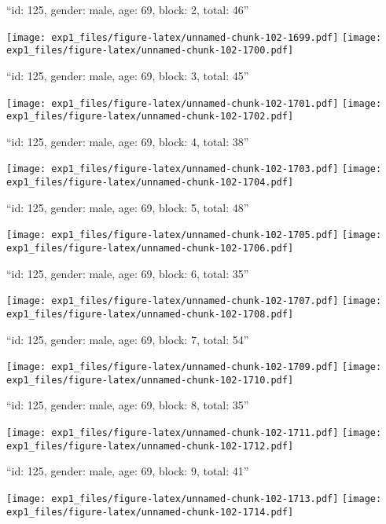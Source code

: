 \documentclass[11pt,,]{article}
\begin{document}
\newpage
[1] 

``id: 125, gender: male, age: 69, block: 2, total: 46''

\texttt{[image: exp1\_files/figure-latex/unnamed-chunk-102-1699.pdf]}
\texttt{[image: exp1\_files/figure-latex/unnamed-chunk-102-1700.pdf]}

\newpage
[1] 

``id: 125, gender: male, age: 69, block: 3, total: 45''

\texttt{[image: exp1\_files/figure-latex/unnamed-chunk-102-1701.pdf]}
\texttt{[image: exp1\_files/figure-latex/unnamed-chunk-102-1702.pdf]}

\newpage
[1] 

``id: 125, gender: male, age: 69, block: 4, total: 38''

\texttt{[image: exp1\_files/figure-latex/unnamed-chunk-102-1703.pdf]}
\texttt{[image: exp1\_files/figure-latex/unnamed-chunk-102-1704.pdf]}

\newpage
[1] 

``id: 125, gender: male, age: 69, block: 5, total: 48''

\texttt{[image: exp1\_files/figure-latex/unnamed-chunk-102-1705.pdf]}
\texttt{[image: exp1\_files/figure-latex/unnamed-chunk-102-1706.pdf]}

\newpage
[1] 

``id: 125, gender: male, age: 69, block: 6, total: 35''

\texttt{[image: exp1\_files/figure-latex/unnamed-chunk-102-1707.pdf]}
\texttt{[image: exp1\_files/figure-latex/unnamed-chunk-102-1708.pdf]}

\newpage
[1] 

``id: 125, gender: male, age: 69, block: 7, total: 54''

\texttt{[image: exp1\_files/figure-latex/unnamed-chunk-102-1709.pdf]}
\texttt{[image: exp1\_files/figure-latex/unnamed-chunk-102-1710.pdf]}

\newpage
[1] 

``id: 125, gender: male, age: 69, block: 8, total: 35''

\texttt{[image: exp1\_files/figure-latex/unnamed-chunk-102-1711.pdf]}
\texttt{[image: exp1\_files/figure-latex/unnamed-chunk-102-1712.pdf]}

\newpage
[1] 

``id: 125, gender: male, age: 69, block: 9, total: 41''

\texttt{[image: exp1\_files/figure-latex/unnamed-chunk-102-1713.pdf]}
\texttt{[image: exp1\_files/figure-latex/unnamed-chunk-102-1714.pdf]}
\end{document}
